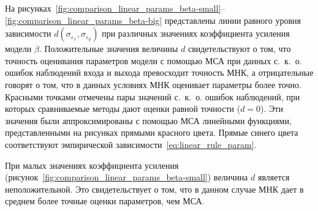 На рисунках~\ref{fig:comparison_linear_params_beta-small}--\ref{fig:comparison_linear_params_beta-big}
представлены линии равного уровня зависимости \( d(\sigma_{\varepsilon_x}, \sigma_{\varepsilon_y}) \)
при различных значениях коэффициента усиления модели \( \beta \).
Положительные значения величины \( d \) свидетельствуют о том,
что точность оценивания параметров модели с помощью МСА при данных с.~к.~о.
ошибок наблюдений входа и выхода превосходит точность МНК,
а отрицательные говорят о том, что в данных условиях МНК оценивает параметры более точно.
Красными точками отмечены пары значений с.~к.~о. ошибок наблюдений,
при которых сравниваемые методы дают оценки равной точности (\( d = 0 \)).
Эти значения были аппроксимированы с помощью МСА линейными функциями,
представленными на рисунках прямыми красного цвета.
Прямые синего цвета соответствуют эмпирической зависимости~\eqref{eq:linear_rule_param}.

При малых значениях коэффициента усиления
(рисунок~\ref{fig:comparison_linear_params_beta-small})
величина \( d \) является неположительной.
Это свидетельствует о том, что в данном случае МНК дает в
среднем более точные оценки параметров, чем МСА.

